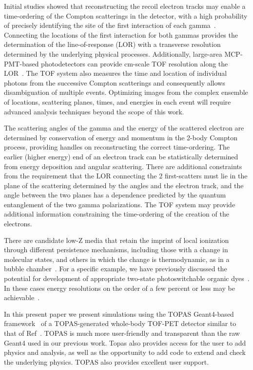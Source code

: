 \documentclass[12pt]{article}
\begin{document}
Initial studies showed that
reconstructing the recoil electron tracks may enable a time-ordering of
the Compton scatterings in the detector, with a high probability of
precisely identifying the site of the first interaction of each
gamma~\cite{PET_NIM_paper}. Connecting the locations of the first
interaction for both gammas provides the determination of the
line-of-response (LOR) with a transverse resolution determined by the
underlying physical processes. Additionally, large-area MCP-PMT-based
photodetectors can provide cm-scale TOF resolution along the
LOR~\cite{PET_NIM_paper}. The TOF system also measures the time and
location of individual photons from the successive Compton scatterings
and consequently allows disambiguation of multiple events. Optimizing
images from the complex ensemble of locations, scattering planes,
times, and energies in each event will require advanced analysis
techniques beyond the scope of this work.

 The scattering angles of the gamma and the energy of the scattered electron are determined by conservation of energy and momentum in the 2-body Compton process, providing handles on reconstructing the correct time-ordering. The earlier (higher energy) end of an electron track can be statistically determined from energy deposition and angular scattering. There are additional constraints from the requirement that the LOR connecting the 2 first-scatters must lie in the plane of the scattering determined by the angles and the electron track, and the angle between the two planes has a dependence predicted by the quantum entanglement of the two gamma polarizations. The TOF system may provide additional information constraining the time-ordering of the creation of the electrons.

There are candidate low-Z media that retain the imprint of local
ionization  through different persistence mechanisms, including those
with a change in molecular states, and others in which the change is
thermodynamic, as in a bubble chamber~\cite{glazer_bubble_chamber}. For
a specific example, we have previously discussed the potential for
development of appropriate two-state photoswitchable organic
dyes~\cite{PET_NIM_paper}. In these cases energy resolutions on the
order of a few percent or less may be achievable~\cite{PET_NIM_paper}.

 In this present paper we present simulations using the TOPAS
 Geant4-based framework~\cite{TOPAS} of a TOPAS-generated whole-body TOF-PET detector similar to
that of Ref~\cite{PET_NIM_paper}. TOPAS is much more user-friendly and
transparent than the raw Geant4 used in our previous work. Topas also
provides access for the user to add physics and analysis, as well as
the opportunity to add code to extend and check the underlying physics.
TOPAS also provides excellent user support.
\end{document}
